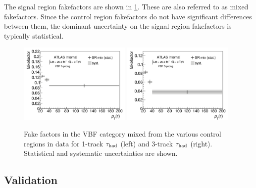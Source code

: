 The signal region fakefactors are shown in \cref{fig:backgrounds-fakefactorsVBFmix}. These are also referred to as mixed fakefactors. Since the control region fakefactors do not have significant differences between them, the dominant uncertainty on the signal region fakefactors is typically statistical.

\begin{figure}[tp]
  \centering
  \includegraphics[width=0.48\textwidth]{figures/backgrounds/fakefactor_8TeV_vbf_1p_mix}
  \includegraphics[width=0.48\textwidth]{figures/backgrounds/fakefactor_8TeV_vbf_3p_mix}
  \caption{Fake factors in the VBF category mixed from the various control regions in data for 1-track $\tau_\text{had}$ (left) and 3-track $\tau_\text{had}$ (right). Statistical and systematic uncertainties are shown.}
  \label{fig:backgrounds-fakefactorsVBFmix}
\end{figure}

\clearpage

\subsection{Validation}


\clearpage

